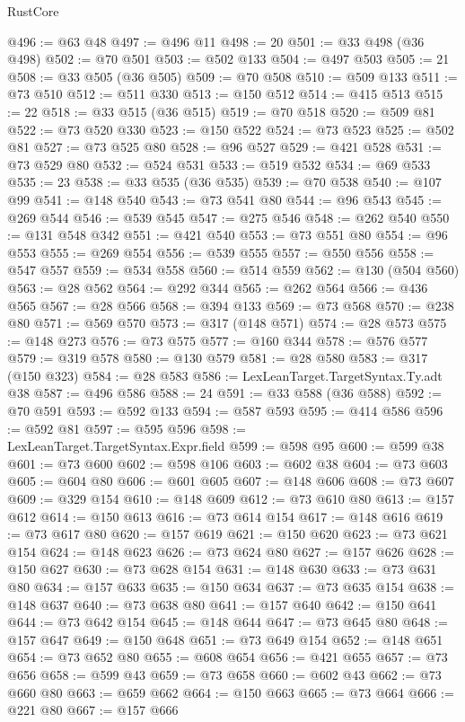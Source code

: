 \begin{lexlean}{RustCore}
\begin{coremodule}
@496 := @63 @48
@497 := @496 @11
@498 := 20
@501 := @33 @498 (@36 @498)
@502 := @70 @501
@503 := @502 @133
@504 := @497 @503
@505 := 21
@508 := @33 @505 (@36 @505)
@509 := @70 @508
@510 := @509 @133
@511 := @73 @510
@512 := @511 @330
@513 := @150 @512
@514 := @415 @513
@515 := 22
@518 := @33 @515 (@36 @515)
@519 := @70 @518
@520 := @509 @81
@522 := @73 @520 @330
@523 := @150 @522
@524 := @73 @523
@525 := @502 @81
@527 := @73 @525 @80
@528 := @96 @527
@529 := @421 @528
@531 := @73 @529 @80
@532 := @524 @531
@533 := @519 @532
@534 := @69 @533
@535 := 23
@538 := @33 @535 (@36 @535)
@539 := @70 @538
@540 := @107 @99
@541 := @148 @540
@543 := @73 @541 @80
@544 := @96 @543
@545 := @269 @544
@546 := @539 @545
@547 := @275 @546
@548 := @262 @540
@550 := @131 @548 @342
@551 := @421 @540
@553 := @73 @551 @80
@554 := @96 @553
@555 := @269 @554
@556 := @539 @555
@557 := @550 @556
@558 := @547 @557
@559 := @534 @558
@560 := @514 @559
@562 := @130 (@504 @560)
@563 := @28 @562
@564 := @292 @344
@565 := @262 @564
@566 := @436 @565
@567 := @28 @566
@568 := @394 @133
@569 := @73 @568
@570 := @238 @80
@571 := @569 @570
@573 := @317 (@148 @571)
@574 := @28 @573
@575 := @148 @273
@576 := @73 @575
@577 := @160 @344
@578 := @576 @577
@579 := @319 @578
@580 := @130 @579
@581 := @28 @580
@583 := @317 (@150 @323)
@584 := @28 @583
@586 := LexLeanTarget.TargetSyntax.Ty.adt @38
@587 := @496 @586
@588 := 24
@591 := @33 @588 (@36 @588)
@592 := @70 @591
@593 := @592 @133
@594 := @587 @593
@595 := @414 @586
@596 := @592 @81
@597 := @595 @596
@598 := LexLeanTarget.TargetSyntax.Expr.field
@599 := @598 @95
@600 := @599 @38
@601 := @73 @600
@602 := @598 @106
@603 := @602 @38
@604 := @73 @603
@605 := @604 @80
@606 := @601 @605
@607 := @148 @606
@608 := @73 @607
@609 := @329 @154
@610 := @148 @609
@612 := @73 @610 @80
@613 := @157 @612
@614 := @150 @613
@616 := @73 @614 @154
@617 := @148 @616
@619 := @73 @617 @80
@620 := @157 @619
@621 := @150 @620
@623 := @73 @621 @154
@624 := @148 @623
@626 := @73 @624 @80
@627 := @157 @626
@628 := @150 @627
@630 := @73 @628 @154
@631 := @148 @630
@633 := @73 @631 @80
@634 := @157 @633
@635 := @150 @634
@637 := @73 @635 @154
@638 := @148 @637
@640 := @73 @638 @80
@641 := @157 @640
@642 := @150 @641
@644 := @73 @642 @154
@645 := @148 @644
@647 := @73 @645 @80
@648 := @157 @647
@649 := @150 @648
@651 := @73 @649 @154
@652 := @148 @651
@654 := @73 @652 @80
@655 := @608 @654
@656 := @421 @655
@657 := @73 @656
@658 := @599 @43
@659 := @73 @658
@660 := @602 @43
@662 := @73 @660 @80
@663 := @659 @662
@664 := @150 @663
@665 := @73 @664
@666 := @221 @80
@667 := @157 @666

\end{coremodule}
\end{lexlean}
